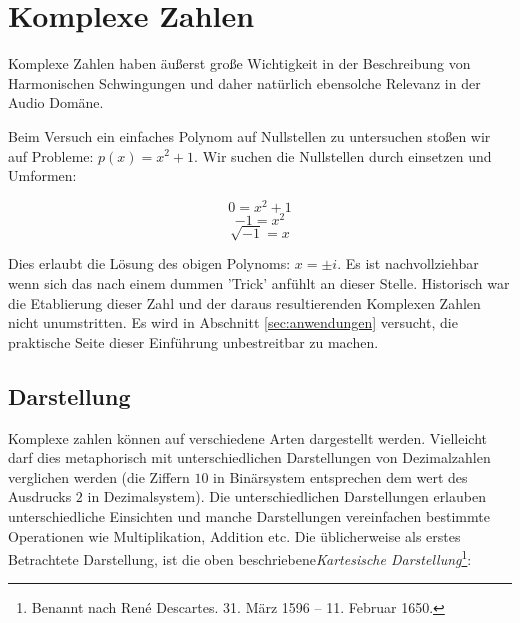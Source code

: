 \chapter{Komplexe Zahlen} \label{chap:complex}

Komplexe Zahlen haben äußerst große Wichtigkeit in der Beschreibung von Harmonischen Schwingungen und daher natürlich ebensolche Relevanz in der Audio Domäne. \\

Beim Versuch ein einfaches Polynom auf Nullstellen zu untersuchen stoßen wir auf Probleme: $p(x) = x^2 + 1$. Wir suchen die Nullstellen durch einsetzen und Umformen:

$$0 = x^2 + 1$$
$$-1 = x^2$$
$$\sqrt{-1} = x$$


Dies erlaubt die Lösung des obigen Polynoms: $x = \pm i$. Es ist nachvollziehbar wenn sich das nach einem dummen 'Trick' anfühlt an dieser Stelle. Historisch war die Etablierung dieser Zahl und der daraus resultierenden Komplexen Zahlen nicht unumstritten. Es wird in Abschnitt \ref{sec:anwendungen} versucht, die praktische Seite dieser Einführung unbestreitbar zu machen. \\

\section{Darstellung}
Komplexe zahlen können auf verschiedene Arten dargestellt werden. Vielleicht darf dies metaphorisch mit unterschiedlichen Darstellungen von Dezimalzahlen verglichen werden (die Ziffern $10$ in Binärsystem entsprechen dem wert des Ausdrucks $2$ in Dezimalsystem). Die unterschiedlichen Darstellungen erlauben unterschiedliche Einsichten und manche Darstellungen vereinfachen bestimmte Operationen wie Multiplikation, Addition etc. 
Die üblicherweise als erstes Betrachtete Darstellung, ist die oben beschriebene\emph{Kartesische Darstellung}\footnote{Benannt nach René Descartes. 31. März 1596 – 11. Februar 1650.}:


